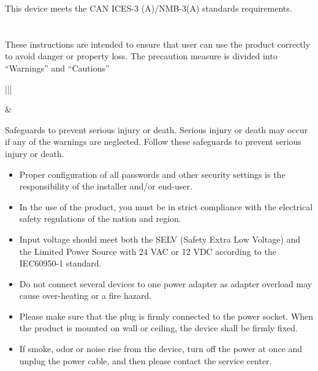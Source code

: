 \documentclass[letterpaper,10pt,english]{sphinxmanual}
\begin{document}

This device meets the CAN ICES-3 (A)/NMB-3(A) standards requirements.


\section{}
\label{\detokenize{legalandsafety:safety-instruction}}
These instructions are intended to ensure that user can use the product correctly to avoid danger or property loss.
The precaution measure is divided into “Warnings” and “Cautions”


\begin{savenotes}\sphinxattablestart
\centering
\begin{tabular}[t]{|||}
\hline

\noindent{}
&
\\
\hline
\end{tabular}
\par
\sphinxattableend\end{savenotes}

 Safeguards to prevent serious injury or death. Serious injury or death may occur if any of the warnings are neglected. Follow these safeguards to prevent serious injury or death.
\begin{itemize}
\item {} 
Proper configuration of all passwords and other security settings is the responsibility of the installer and/or end-user.

\item {} 
In the use of the product, you must be in strict compliance with the electrical safety regulations of the nation and region.

\item {} 
Input voltage should meet both the SELV (Safety Extra Low Voltage) and the Limited Power Source with 24 VAC or 12 VDC according to the IEC60950-1 standard.

\item {} 
Do not connect several devices to one power adapter as adapter overload may cause over-heating or a fire hazard.

\item {} 
Please make sure that the plug is firmly connected to the power socket. When the product is mounted on wall or ceiling, the device shall be firmly fixed.

\item {} 
If smoke, odor or noise rise from the device, turn off the power at once and unplug the power cable, and then please contact the service center.

\end{itemize}
\end{document}
